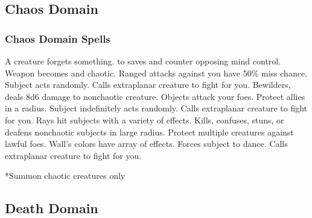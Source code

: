 \subsection{Chaos Domain}

\subsubsection{Chaos Domain Spells}
\begin{spelllist}
   A creature forgets something.
    to saves and counter opposing mind control.
   Weapon becomes  and chaotic.
   Ranged attacks against you have 50\% miss chance.
   Subject acts randomly.
   Calls extraplanar creature to fight for you.
   Bewilders, deals 8d6 damage to nonchaotic creature.
   Objects attack your foes.
   Protect allies in a \areamed radius.
   Subject indefinitely acts randomly.
   Calls extraplanar creature to fight for you.
   Rays hit subjects with a variety of effects.
   Kills, confuses, stuns, or deafens nonchaotic subjects in large radius.
  \F Protect multiple creatures against lawful foes. 
   Wall's colors have array of effects.
   Forces subject to dance.
   Calls extraplanar creature to fight for you.
\end{spelllist}
*Summon chaotic creatures only

\subsection{Death Domain}
